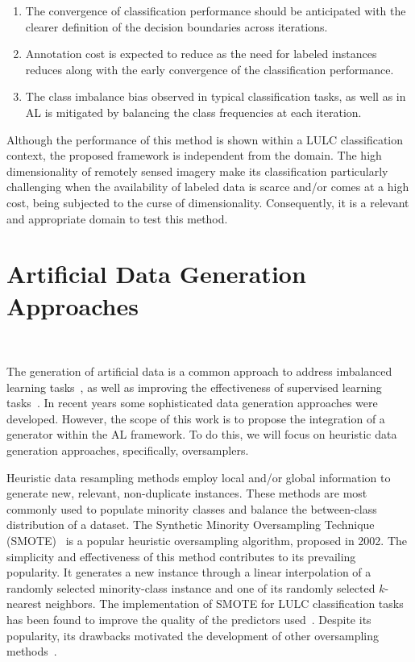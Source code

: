 \documentclass[remotesensing,article,submit,moreauthors,pdftex]{Definitions/mdpi}
\begin{document}
\begin{enumerate}
    \item The convergence of classification performance should be anticipated
        with the clearer definition of the decision boundaries across
        iterations.
    \item Annotation cost is expected to reduce as the need for labeled
        instances reduces along with the early convergence of the
        classification performance.
    \item The class imbalance bias observed in typical classification tasks, as
        well as in AL is mitigated by balancing the class frequencies at each
        iteration.
\end{enumerate}

Although the performance of this method is shown within a LULC classification
context, the proposed framework is independent from the domain. The high
dimensionality of remotely sensed imagery make its classification particularly
challenging when the availability of labeled data is scarce and/or comes at a
high cost, being subjected to the curse of dimensionality. Consequently, it is
a relevant and appropriate domain to test this method.

\section{Artificial Data Generation Approaches}~\label{sec:ovs-sota}

The generation of artificial data is a common approach to address imbalanced
learning tasks~\cite{Kaur2019}, as well as improving the effectiveness of
supervised learning tasks~\cite{DeVries2017}. In recent years some
sophisticated data generation approaches were developed. However, the scope of
this work is to propose the integration of a generator within the AL
framework. To do this, we will focus on heuristic data generation approaches,
specifically, oversamplers.

Heuristic data resampling methods employ local and/or global information to
generate new, relevant, non-duplicate instances. These methods are most
commonly used to populate minority classes and balance the between-class
distribution of a dataset. The Synthetic Minority Oversampling Technique
(SMOTE)~\cite{Chawla2002} is a popular heuristic oversampling algorithm,
proposed in 2002. The simplicity and effectiveness of this method contributes
to its prevailing popularity. It generates a new instance through a linear
interpolation of a randomly selected minority-class instance and one of its
randomly selected $k$-nearest neighbors. The implementation of SMOTE for LULC
classification tasks has been found to improve the quality of the predictors
used~\cite{Jozdani2019,Bogner2018}. Despite its popularity, its drawbacks
motivated the development of other oversampling methods~\cite{Douzas2019}.
\end{document}
